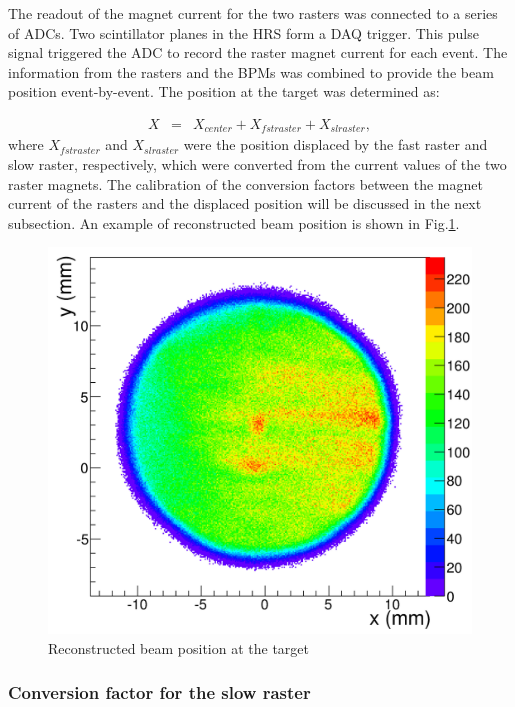 \documentclass[english,review,number,sort&compress]{elsarticle}
\begin{document}
The readout of the magnet current for the two rasters was connected to a series of ADCs. Two scintillator planes in the HRS form a DAQ trigger. This pulse signal triggered the ADC to record the raster magnet current for each event. The information from the rasters and the BPMs was combined to provide the beam position event-by-event. The position at the target was determined as:

\begin{eqnarray}
X & = & X_{center}+X_{fstraster}+X_{slraster},\label{eq:tot_pos}
\end{eqnarray}
where $X_{fstraster}$ and $X_{slraster}$ were the position displaced by the fast raster and slow raster, respectively, which were converted from the current values of the two raster magnets. The calibration of the conversion factors between the magnet current of the rasters and the displaced position will be discussed in the next subsection. An example of reconstructed beam position is shown in Fig.\ref{fig:Reconstructed-beam-position}.
\begin{figure}
\begin{centering}
\includegraphics[width=0.6\columnwidth]{reconed}
\par\end{centering}

\protect\caption{\label{fig:Reconstructed-beam-position}Reconstructed beam position at the target}


\end{figure}



\subsubsection{Conversion factor for the slow raster}
\end{document}
